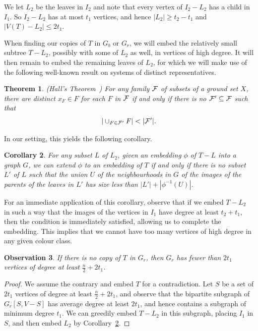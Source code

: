 \documentclass[11pt]{article}
\newtheorem{theorem}{Theorem}[section]
\newtheorem{cor}[theorem]{Corollary}
\newtheorem{obs}[theorem]{Observation}
\begin{document}
We let $L_2$ be the leaves in $I_2$ and note that every vertex of $I_2-L_2$ has a child in $I_1$. So $I_2-L_2$ has at most $t_1$ vertices, and hence $|L_2| \ge t_2-t_1$ and $|V(T)-L_2| \le 2t_1$. 

When finding our copies of $T$ in $G_b$ or $G_r$, we will embed the relatively small subtree $T - L_2$, possibly with some of $L_2$ as well, in vertices of high degree. It will then remain to embed the remaining leaves of $L_2$, for which we will make use of the following well-known result on systems of distinct representatives.

\begin{theorem}(Hall's Theorem~\cite{Hl})
For any family ${\cal F}$ of subsets of a ground set $X$, there are distinct $x_F \in F$ for each $F$ in ${\cal F}$ if and only if there is no ${\cal F}' \subseteq {\cal F}$ such that
\[ |\cup_{F \in {\cal F}'} F| <|{\cal F}'|. \]
\end{theorem}

In our setting, this yields the following corollary.

\begin{cor} \label{cor:Hall}
For any subset $L$ of $L_2$, given an embedding $\phi$ of $T-L$ into a graph $G$, we can extend $\phi$ to an embedding of $T$ if and only if there is no subset $L'$ of $L$ such that the union $U$ of the neighbourhoods in $G$ of the images of the parents of the leaves in $L'$ has size less than $|L'|+|\phi^{-1}(U)|$. 
\end{cor}

For an immediate application of this corollary, observe that if we embed $T - L_2$ in such a way that the images of the vertices in $I_1$ have degree at least $t_2 + t_1$, then the condition is immediately satisfied, allowing us to complete the embedding. 
This implies that we cannot have too many vertices of high degree in any given colour class.

\begin{obs}
    If there is no copy of $T$ in $G_r$, then $G_r$
    has fewer than $2 t_1$ vertices of degree at least $\frac{n}{2}+2 t_1$. 
\end{obs}

\begin{proof}
We assume the contrary  and embed $T$ for a contradiction. Let $S$ be a set of $2t_1$ vertices of degree at least $\frac{n}{2} + 2t_1$, and observe that the bipartite subgraph of $G_r[S, V-S]$ has average degree at least $2t_1$, and hence contains a subgraph of minimum degree $t_1$. We can greedily embed $T-L_2$ in this subgraph, placing $I_1$ in $S$, and then embed $L_2$ by Corollary~\ref{cor:Hall}.
\end{proof}
\end{document}
